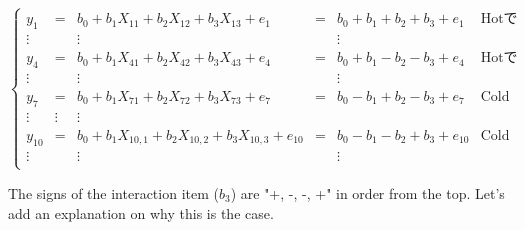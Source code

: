 \documentclass{ltjbook}
\begin{document}
\[
	\label{eq13_06}
	\left\{
	\begin{array}{cccccc}
		y_1    & =      & b_0 + b_1 X_{11} + b_2 X_{12} + b_3 X_{13}+ e_1          & = & b_0 + b_1 + b_2  + b_3 + e_1   & \mbox{Hotで銘柄A}  \\
		\vdots &        & \vdots                                                   &   & \vdots                                           \\
		y_4    & =      & b_0 + b_1 X_{41} + b_2 X_{42} + b_3 X_{43}+ e_4          & = & b_0 + b_1 - b_2 - b_3 + e_4    & \mbox{Hotで銘柄B}  \\
		\vdots &        & \vdots                                                   &   & \vdots                                           \\
		y_7    & =      & b_0 + b_1 X_{71} + b_2 X_{72} + b_3 X_{73}+ e_7          & = & b_0 - b_1 + b_2 - b_3 + e_7    & \mbox{Coldで銘柄A} \\
		\vdots & \vdots & \vdots                                                                                                          \\
		y_{10} & =      & b_0 + b_1 X_{10,1} + b_2 X_{10,2} + b_3 X_{10,3}+ e_{10} & = & b_0 - b_1 - b_2+ b_3  + e_{10} & \mbox{Coldで銘柄B} \\
		\vdots &        & \vdots                                                   &   & \vdots                         &                 \\
	\end{array}
	\right .
\]

The signs of the interaction item ($b_3$) are "+, -, -, +" in order from the top. Let's add an explanation on why this is the case.
\end{document}
